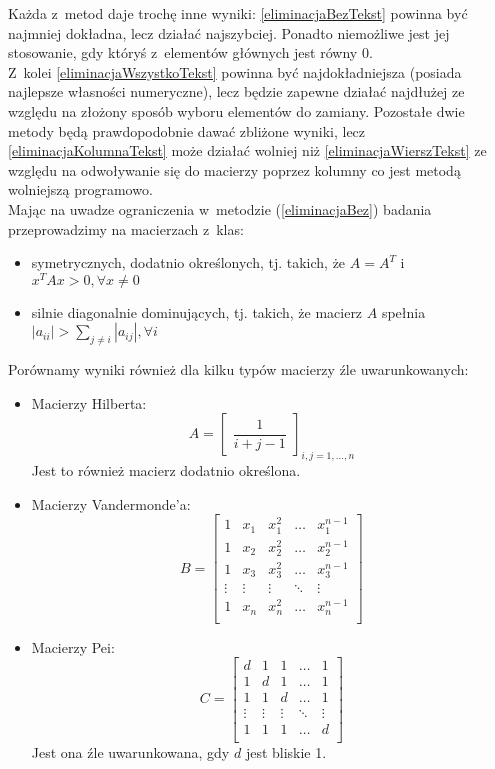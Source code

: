 \documentclass[a4paper]{article}
\begin{document}
Każda z~metod daje trochę inne wyniki: \ref{eliminacjaBezTekst} powinna być najmniej dokładna, lecz działać najszybciej. Ponadto niemożliwe jest jej stosowanie, gdy któryś z~elementów głównych jest równy $0$.
\\ \indent Z~kolei \ref{eliminacjaWszystkoTekst} powinna być najdokładniejsza (posiada najlepsze własności numeryczne), lecz będzie zapewne działać najdłużej ze względu na złożony sposób wyboru elementów do zamiany. Pozostałe dwie metody będą prawdopodobnie dawać 
zbliżone wyniki, lecz \ref{eliminacjaKolumnaTekst} może działać wolniej niż \ref{eliminacjaWierszTekst} ze względu na odwoływanie się do macierzy poprzez kolumny co jest metodą wolniejszą programowo.
\\ \indent Mając na uwadze ograniczenia w~metodzie (\ref{eliminacjaBez}) badania przeprowadzimy na macierzach z~klas:
\begin{itemize}
 \item symetrycznych, dodatnio określonych, tj. takich, że $A=A^T$ i $x^TAx > 0, \forall x \neq 0$
 \item silnie diagonalnie dominujących, tj. takich, że macierz $A$ spełnia $|a_{ii}| > \sum_{j\neq i}|a_{ij}|, \forall i$
\end{itemize}
Porównamy wyniki również dla kilku typów macierzy źle uwarunkowanych:
\begin{itemize}
 \item Macierzy Hilberta:
  \begin{equation}
  A =
    \begin{bmatrix}
    \dfrac 1 {i + j - 1}
    \end{bmatrix}_{i,j=1,\dots,n}
  \end{equation}
Jest to również macierz dodatnio określona.
  \item Macierzy Vandermonde'a:
\begin{equation}
  B =
    \begin{bmatrix}
    1		& x_1	& x_1^2 & \dots & x_1^{n-1}	\\
    1		& x_2	& x_2^2 & \dots & x_2^{n-1}	\\
    1		& x_3	& x_3^2 & \dots & x_3^{n-1}	\\
    \vdots	& \vdots& \vdots& \ddots& \vdots	\\
    1		& x_n	& x_n^2 & \dots & x_n^{n-1}	\\
    \end{bmatrix}
  \end{equation}
\item Macierzy Pei:
\begin{equation}
  C =
    \begin{bmatrix}
    d		& 1	&	1 & \dots & 1		\\
    1		& d	&	1 & \dots & 1		\\
    1		& 1	&	d & \dots & 1		\\
    \vdots	& \vdots& \vdots  & \ddots& \vdots	\\
    1		& 1	&	1 & \dots &   d		\\
    \end{bmatrix}
  \end{equation} 
Jest ona źle uwarunkowana, gdy $d$ jest bliskie 1.
\end{itemize}
\end{document}
